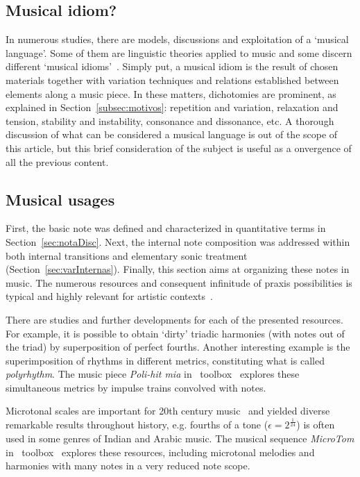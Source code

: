 \subsection{Musical idiom?}
In numerous studies, there are models, discussions and exploitation of a `musical language'.
Some of them are linguistic theories applied to music
and some discern different `musical
idioms'~\cite{Lerdahl, Harmonia, Salzer,Alfaix}. Simply put, a musical idiom
is the result of chosen materials together with variation techniques and
relations established between elements along a music piece. In these matters,
dichotomies are prominent, as explained in Section~\ref{subsec:motivos}:
repetition and variation, relaxation and tension, stability and instability, consonance and dissonance, etc.
A thorough discussion of what can be considered a musical language is out of the scope of this article, but this brief consideration of the subject is useful as a onvergence of all the previous content.

\subsection{Musical usages}\label{subsec:usosmusicais3}
First, the basic note was defined and characterized in quantitative terms in Section~\ref{sec:notaDisc}.
Next, the internal note
composition was addressed within both internal transitions and elementary sonic treatment
(Section~\ref{sec:varInternas}). Finally, this section aims at organizing these notes in music. The numerous resources and consequent infinitude
of praxis possibilities is typical and highly relevant for artistic contexts~\cite{Harmonia,Webern}.

There are studies and further developments for each of the presented resources.
For example, it is possible to obtain `dirty' triadic harmonies (with notes out of the triad) by superposition of perfect fourths.
Another interesting example is the superimposition of rhythms in different metrics, constituting what is
called \emph{polyrhythm}. The music piece \emph{Poli-hit mia} in \massa\ toolbox~\cite{MASSA} explores these simultaneous metrics by impulse trains convolved with notes.

Microtonal scales are important for 20th
century music~\cite{microtonalidade} and yielded diverse remarkable results throughout history, e.g.
fourths of a tone ($\epsilon=2^{\frac{1}{24}}$) is often used in some genres of Indian and Arabic music. The musical sequence \emph{MicroTom} in \massa\ toolbox~\cite{MASSA} explores these resources, including microtonal melodies and harmonies
with many notes in a very reduced note scope.

